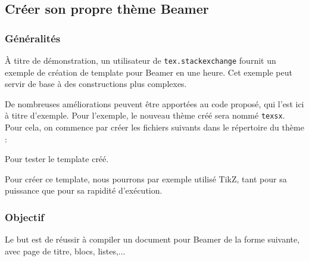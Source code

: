 \subsection{Créer son propre thème Beamer}
\subsubsection{Généralités}
À titre de démonstration, un utilisateur de \texttt{tex.stackexchange} fournit un exemple de création de template pour Beamer en une heure. Cet exemple peut servir de base à des constructions plus complexes.

De nombreuses améliorations peuvent être apportées au code proposé, qui l'est ici à titre d'exemple. Pour l'exemple, le nouveau thème créé sera nommé \texttt{texsx}. Pour cela, on commence par créer les fichiers suivants dans le répertoire du thème :\begin{itemize}
Pour tester le template créé.
\end{itemize}
Pour créer ce template, nous pourrons par exemple utilisé TikZ, tant pour sa puissance que pour sa rapidité d'exécution.

\subsubsection{Objectif}
Le but est de réussir à compiler un document pour Beamer de la forme suivante, avec page de titre, blocs, listes,...

